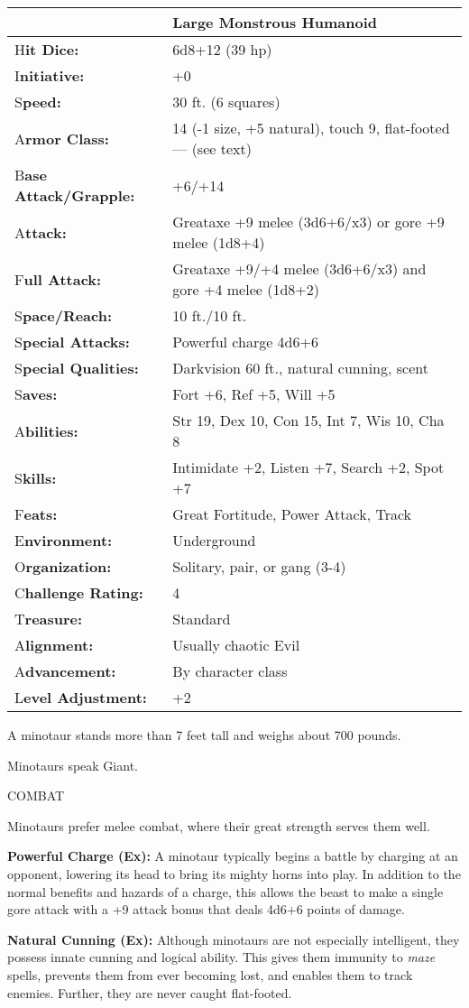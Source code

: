 \documentclass{article}
\begin{document}
\begin{tabular}{|>{\raggedright}p{88pt}|>{\raggedright}p{237pt}|}
\hline
  & Large Monstrous Humanoid\tabularnewline
\hline
H\textbf{it Dice:} & 6d8+12 (39 hp)\tabularnewline
\hline
I\textbf{nitiative:} & +0\tabularnewline
\hline
S\textbf{peed:} & 30 ft. (6 squares)\tabularnewline
\hline
A\textbf{rmor Class:} & 14 (-1 size, +5 natural), touch 9, flat-footed --- (see 
text)\tabularnewline
\hline
B\textbf{ase Attack/Grapple:} & +6/+14\tabularnewline
\hline
A\textbf{ttack:} & Greataxe +9 melee (3d6+6/x3) or gore +9 melee (1d8+4)\tabularnewline
\hline
F\textbf{ull Attack:} & Greataxe +9/+4 melee (3d6+6/x3) and gore +4 melee (1d8+2)\tabularnewline
\hline
S\textbf{pace/Reach:} & 10 ft./10 ft.\tabularnewline
\hline
S\textbf{pecial Attacks:} & Powerful charge 4d6+6\tabularnewline
\hline
S\textbf{pecial Qualities:} & Darkvision 60 ft., natural cunning, scent\tabularnewline
\hline
S\textbf{aves:} & Fort +6, Ref +5, Will +5\tabularnewline
\hline
A\textbf{bilities:} & Str 19, Dex 10, Con 15, Int 7, Wis 10, Cha 8\tabularnewline
\hline
S\textbf{kills:} & Intimidate +2, Listen +7, Search +2, Spot +7\tabularnewline
\hline
F\textbf{eats:} & Great Fortitude, Power Attack, Track\tabularnewline
\hline
E\textbf{nvironment:} & Underground\tabularnewline
\hline
O\textbf{rganization:} & Solitary, pair, or gang (3-4)\tabularnewline
\hline
C\textbf{hallenge Rating:} & 4\tabularnewline
\hline
T\textbf{reasure:} & Standard\tabularnewline
\hline
A\textbf{lignment:} & Usually chaotic Evil \tabularnewline
\hline
A\textbf{dvancement:} & By character class\tabularnewline
\hline
L\textbf{evel Adjustment:} & +2\tabularnewline
\hline
\end{tabular}

A minotaur stands more than 7 feet tall and weighs about 700 pounds.

Minotaurs speak Giant.

COMBAT

Minotaurs prefer melee combat, where their great strength serves them well.

\textbf{Powerful Charge (Ex): }A minotaur typically begins a battle by charging 
at an opponent, lowering its head to bring its mighty horns into play. In addition 
to the normal benefits and hazards of a charge, this allows the beast to make a 
single gore attack with a +9 attack bonus that deals 4d6+6 points of damage.

\textbf{Natural Cunning (Ex): }Although minotaurs are not especially intelligent, 
they possess innate cunning and logical ability. This gives them immunity to \textit{maze 
}spells, prevents them from ever becoming lost, and enables them to track enemies. 
Further, they are never caught flat-footed.
\end{document}
